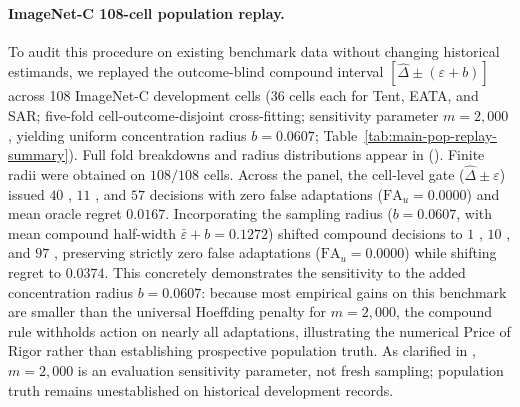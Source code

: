 \paragraph{ImageNet-C 108-cell population replay.}
To audit this procedure on existing benchmark data without changing historical estimands, we replayed the outcome-blind compound interval $[\widehat\Delta \pm (\varepsilon + b)]$ across 108 ImageNet-C development cells (36 cells each for Tent, EATA, and SAR; five-fold cell-outcome-disjoint cross-fitting; sensitivity parameter $m=2{,}000$, yielding uniform concentration radius $b=0.0607$; Table~\ref{tab:main-pop-replay-summary}). Full fold breakdowns and radius distributions appear in  ().
Finite radii were obtained on $108/108$ cells. Across the panel, the cell-level gate ($\widehat\Delta \pm \varepsilon$) issued $40$ \adapt, $11$ \freeze, and $57$ \abstain decisions with zero false adaptations ($\mathrm{FA}_u = 0.0000$) and mean oracle regret $0.0167$. Incorporating the sampling radius ($b=0.0607$, with mean compound half-width $\bar\varepsilon + b = 0.1272$) shifted compound decisions to $1$ \adapt, $10$ \freeze, and $97$ \abstain, preserving strictly zero false adaptations ($\mathrm{FA}_u = 0.0000$) while shifting regret to $0.0374$. This concretely demonstrates the sensitivity to the added concentration radius $b=0.0607$: because most empirical gains on this benchmark are smaller than the universal Hoeffding penalty for $m=2{,}000$, the compound rule withholds action on nearly all adaptations, illustrating the numerical Price of Rigor rather than establishing prospective population truth. As clarified in , $m=2{,}000$ is an evaluation sensitivity parameter, not fresh sampling; population truth remains unestablished on historical development records.

